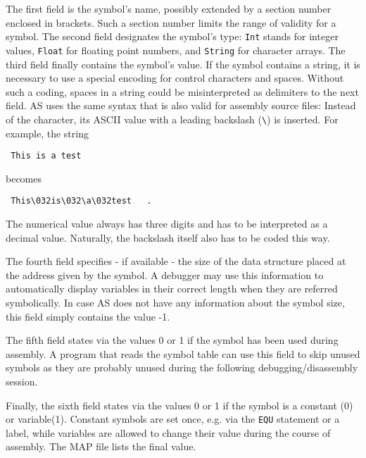 \documentclass[12pt,twoside]{report}
\newcommand{\tty}[1]{{\tt #1}}
\newcommand{\asname}{{AS}}
\begin{document}
The first field is the symbol's name, possibly extended by a section
number enclosed in brackets.  Such a section number limits the
range of validity for a symbol.  The second field designates the
symbol's type: \tty{Int} stands for integer values, \tty{Float} for floating
point numbers, and \tty{String} for character arrays.  The third field
finally contains the symbol's value.  If the symbol contains a
string, it is necessary to use a special encoding for control
characters and spaces.  Without such a coding, spaces in a string
could be misinterpreted as delimiters to the next field.  \asname{} uses the
same syntax that is also valid for assembly source files: Instead of
the character, its ASCII value with a leading backslash (\verb!\!) is
inserted.  For example, the string
\begin{verbatim}
 This is a test
\end{verbatim}
becomes
\begin{verbatim}
 This\032is\032\a\032test   .
\end{verbatim}
The numerical value always has three digits and has to be interpreted
as a decimal value.  Naturally, the backslash itself also has to be
coded this way.

The fourth field specifies - if available - the size of the data
structure placed at the address given by the symbol.   A debugger may
use this information to automatically display variables in their
correct length when they are referred symbolically.  In case \asname{} does
not have any information about the symbol size, this field simply
contains the value -1.

The fifth field states via the values 0 or 1 if the symbol has been
used during assembly.  A program that reads the symbol table can use
this field to skip unused symbols as they are probably unused during
the following debugging/disassembly session.

Finally, the sixth field states via the values 0 or 1 if the symbol
is a constant (0) or variable(1).  Constant symbols are set once, e.g.
via the \tty{EQU} statement or a label, while variables are allowed
to change their value during the course of assembly.  The MAP file
lists the final value.
\end{document}
